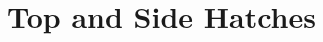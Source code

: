 \documentclass[../../main]{subfiles}
\begin{document}
\section{Top and Side Hatches} \label{sec:}


\end{document}
